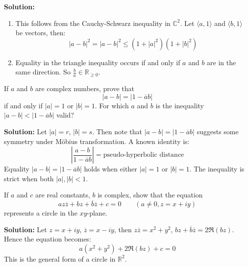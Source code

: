 \textbf{Solution:}
\begin{enumerate}[label=\alph*)]
\item This follows from the Cauchy-Schwarz inequality in \( \mathbb{C}^2 \). Let \( \langle a, 1 \rangle \) and \( \langle b, 1 \rangle \) be vectors, then:
\[
|a - b|^2 = |a - b|^2 \leq (1 + |a|^2)(1 + |b|^2)
\]
\item Equality in the triangle inequality occurs if and only if \( a \) and \( b \) are in the same direction. So \( \frac{b}{a} \in \mathbb{R}_{\geq 0} \).
\end{enumerate}

\begin{problembox}
If \( a \) and \( b \) are complex numbers, prove that
\[
|a - b| = |1 - \overline{a}b|
\]
if and only if \( |a| = 1 \) or \( |b| = 1 \). For which \( a \) and \( b \) is the inequality \( |a - b| < |1 - \overline{a}b| \) valid?
\end{problembox}

\textbf{Solution:}
Let \( |a| = r \), \( |b| = s \). Then note that \( |a - b| = |1 - \overline{a}b| \) suggests some symmetry under Möbius transformation. A known identity is:
\[
\left| \frac{a - b}{1 - \overline{a}b} \right| = \text{pseudo-hyperbolic distance}
\]
Equality \( |a - b| = |1 - \overline{a}b| \) holds when either \( |a| = 1 \) or \( |b| = 1 \). The inequality is strict when both \( |a|, |b| < 1 \).

\begin{problembox}
If \( a \) and \( c \) are real constants, \( b \) is complex, show that the equation
\[
az\overline{z} + bz + \overline{b} \overline{z} + c = 0 \qquad (a \ne 0, z = x + iy)
\]
represents a circle in the \( xy \)-plane.
\end{problembox}

\textbf{Solution:}
Let \( z = x + iy \), \( \overline{z} = x - iy \), then \( z \overline{z} = x^2 + y^2 \), \( bz + \overline{b} \overline{z} = 2 \Re(b z) \). Hence the equation becomes:
\[
a(x^2 + y^2) + 2 \Re(b z) + c = 0
\]
This is the general form of a circle in \( \mathbb{R}^2 \).

